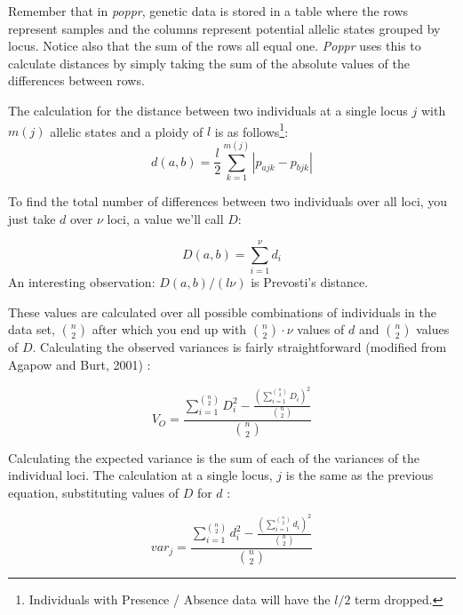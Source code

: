 \documentclass[letterpaper]{article}\usepackage[]{graphicx}\usepackage[]{color}
\newcommand{\poppr}{\textit{poppr}}
\newcommand{\Poppr}{\textit{Poppr}}
\begin{document}
Remember that in \poppr{}, genetic data is stored in a table where the rows
represent samples and the columns represent potential allelic states grouped by
locus. Notice also that the sum of the rows all equal one. \Poppr{} uses this to
calculate distances by simply taking the sum of the absolute values of the
differences between rows.

The calculation for the distance between two individuals at a single locus $j$
with $m(j)$ allelic states and a ploidy of $l$ is as follows\footnote{Individuals
with Presence / Absence data will have the $l/2$ term dropped.}:
\begin{equation}
\label{eq:ia_d}
  d(a,b)=\frac{l}{2} \sum_{k=1}^{m(j)}
  |p_{ajk} - p_{bjk}|
\end{equation}


\noindent
To find the total number of differences between two individuals over all loci,
you just take $d$ over $\nu$ loci, a value we'll call $D$:

\begin{equation}
\label{eq:ia_D}
D(a,b) = \displaystyle \sum_{i=1}^{\nu} d_i
\end{equation}
An interesting observation: $D(a,b)/(l\nu)$ is Prevosti's distance.

These values are calculated over all possible combinations of individuals in the
data set, ${n \choose 2}$ after which you end up with ${n \choose 2}\cdot{}\nu$
values of $d$ and ${n \choose 2}$ values of $D$. Calculating the observed
variances is fairly straightforward (modified from Agapow and Burt, 2001)
\citep{Agapow:2001}:

\begin{equation}
\label{eq:V_O}
V_O = \frac{\displaystyle \sum_{i=1}^{n \choose 2} D_{i}^2 - \frac{\left(\displaystyle\sum_{i=1}^{n \choose 2} D_{i}\right)^2}{{n \choose 2}}}{{n \choose 2}}
\end{equation}

Calculating the expected variance is the sum of each of the variances of the
individual loci. The calculation at a single locus, $j$ is the same as the
previous equation, substituting values of $D$ for $d$ \citep{Agapow:2001}:

\begin{equation}
\label{eq:var_j}
var_j = \frac{\displaystyle \sum_{i=1}^{n \choose 2} d_{i}^2 - \frac{\left(\displaystyle\sum_{i=1}^{n \choose 2} d_i\right)^2}{{n \choose 2}}}{{n \choose 2}}
\end{equation}
\end{document}

